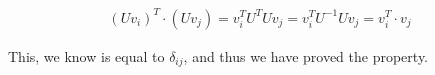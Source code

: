 \documentclass[english,notitlepage]{revtex4-1}  %
\begin{document}
\begin{align*}
\left(U v_i \right)^T \cdot (U v_j) = v_i^T U^T U v_j = v_i^T U^{-1} U v_j = v_i^T \cdot v_j
\end{align*}

This, we know is equal to $\delta_{ij}$, and thus we have proved the property.




\end{document}

